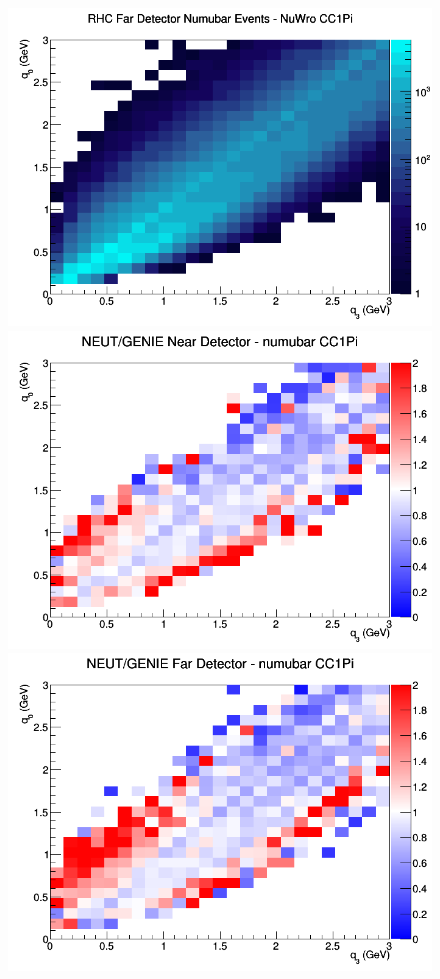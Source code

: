 \documentclass[12pt]{article}
\begin{document}
\begin{figure}[h]
\endminipage
{}
\includegraphics[width=\linewidth]{eff_q0_q3/FGT/CC1Pi_RHC_FD_numubar_q3_q0_NuWro.png}
\endminipage
\newline
{}
\includegraphics[width=\linewidth]{eff_q0_q3/FGT/ratios/CC1Pi_NEUT_GENIE_numubar_near_q3_q0.png}
\endminipage
{}
\includegraphics[width=\linewidth]{eff_q0_q3/FGT/ratios/CC1Pi_NEUT_GENIE_numubar_far_q3_q0.png}

\end{figure}
\end{document}
